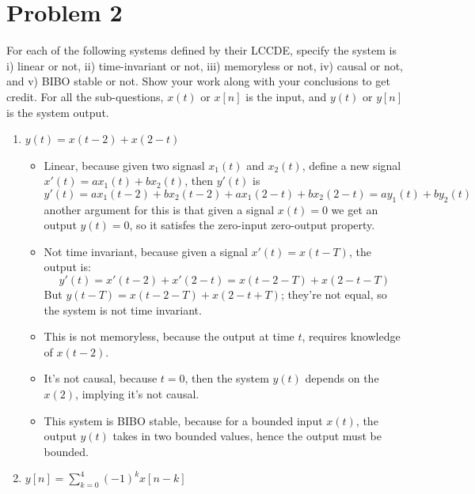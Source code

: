 \documentclass[10pt]{article}
\begin{document}
	\section*{Problem 2}
	For each of the following systems defined by their LCCDE, specify the system is i) linear or not, 
	ii) time-invariant or not, iii) memoryless or not, iv) causal or not, and v) BIBO stable or not. Show 
	your work along with your conclusions to get credit. For all the sub-questions, \( x(t) \) or 
	\( x[n] \) is the input, and \( y(t)  \) or  \( y[n] \) is the system output.
	\begin{enumerate}[label=\alph*)]
		\item \( y(t) = x(t - 2) + x(2 - t) \) 

			\begin{solution}
				\begin{itemize}
					\item Linear, because given two signasl \( x_1(t) \) and \( x_2(t) \), define a new signal 
						\( x'(t) = ax_1(t) + bx_2(t) \), then \( y'(t) \) is
						\[
						y'(t) = ax_1(t - 2) + bx_2(t - 2) + ax_1(2 - t) + bx_2(2 - t) = ay_1(t) + by_2(t)
						\] 
						another argument for this is that given a signal \( x(t) = 0 \) we get an output
						\( y(t) = 0 \), so it satisfes the zero-input zero-output property. 
					\item Not time invariant, because given a signal \( x'(t) = x(t - T) \), the output is: 
						\[
						y'(t) = x'(t - 2) + x'(2 - t) = x(t - 2 - T) + x(2 - t - T) 
						\] 
						But \( y(t - T) = x(t - 2 - T) + x(2 - t + T) \); they're not equal, so the system is not
						 time invariant.
					\item This is not memoryless, because the output at time \( t \), requires knowledge of 
						\( x(t - 2) \). 
					\item It's not causal, because \( t = 0 \), then the system \( y(t) \) depends on the 
						 \( x(2) \), implying it's not causal.
					\item This system is BIBO stable, because for a bounded input \( x(t) \), the output 
						\( y(t) \) takes in two bounded values, hence the output must be bounded. 
				\end{itemize}
			\end{solution}
		\item \( y[n] = \sum_{k = 0}^{4}(-1)^{k}x[n - k] \)


\end{enumerate}
\end{document}
